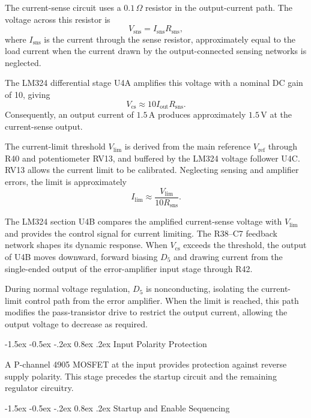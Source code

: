 \documentclass[conference]{IEEEtran}
\makeatletter
\renewcommand\subsection{\@startsection{subsection}{2}{\z@}%
  {-1.5ex \@plus -0.5ex \@minus -.2ex}%
  {0.8ex \@plus .2ex}%
  {\normalfont\sffamily\normalsize\bfseries}}
\makeatother
\begin{document}
The current-sense circuit uses a
\(0.1\,\Omega\) resistor in the output-current path.
The voltage across this resistor is
\[
V_{\mathrm{sns}}
=
I_{\mathrm{sns}}R_{\mathrm{sns}},
\]
where \(I_{\mathrm{sns}}\) is the current through
the sense resistor, approximately equal to the
load current when the current drawn by the
output-connected sensing networks is neglected.

The LM324 differential stage U4A amplifies this
voltage with a nominal DC gain of 10, giving
\[
V_{\mathrm{cs}}
\approx
10 I_{\mathrm{out}}R_{\mathrm{sns}}.
\]
Consequently, an output current of
\(1.5\,\mathrm{A}\) produces approximately
\(1.5\,\mathrm{V}\) at the current-sense output.

The current-limit threshold \(V_{\mathrm{lim}}\)
is derived from the main reference \(V_{\mathrm{ref}}\)
through R40 and potentiometer RV13, and buffered
by the LM324 voltage follower U4C. RV13 allows
the current limit to be calibrated. Neglecting
sensing and amplifier errors, the limit is
approximately
\[
I_{\mathrm{lim}}
\approx
\frac{V_{\mathrm{lim}}}{10R_{\mathrm{sns}}}.
\]

The LM324 section U4B compares the amplified
current-sense voltage with \(V_{\mathrm{lim}}\)
and provides the control signal for current limiting.
The R38--C7 feedback network shapes its dynamic
response. When \(V_{\mathrm{cs}}\) exceeds the
threshold, the output of U4B moves downward,
forward biasing \(D_5\) and drawing current from
the single-ended output of the error-amplifier
input stage through R42.

During normal voltage regulation, \(D_5\) is
nonconducting, isolating the current-limit control
path from the error amplifier. When the limit is
reached, this path modifies the pass-transistor
drive to restrict the output current, allowing
the output voltage to decrease as required.

\subsection{Input Polarity Protection}

A P-channel 4905 MOSFET at the input provides protection
against reverse supply polarity. This stage precedes
the startup circuit and the remaining regulator circuitry.

\subsection{Startup and Enable Sequencing}
\end{document}
